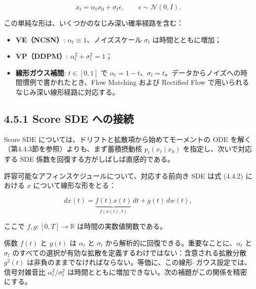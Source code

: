 \[
x_t=\alpha_t x_0 + \sigma_t\epsilon, \qquad \epsilon\sim\mathcal{N}(0,I).
\]


この単純な形は、いくつかのなじみ深い確率経路を含む：

\begin{itemize}
\item \textbf{VE（NCSN）}: $\alpha_t\equiv 1$、ノイズスケール $\sigma_t$ は時間とともに増加；
\item \textbf{VP（DDPM）}: $\alpha_t^2+\sigma_t^2=1$；
\item \textbf{線形ガウス補間}: $t\in[0,1]$ で $\alpha_t=1-t$、$\sigma_t=t$。データからノイズへの時間慣例で書かれたとき、Flow Matching および Rectified Flow で用いられるなじみ深い線形経路に対応する。
\end{itemize}


\subsection*{4.5.1 Score SDE への接続}


Score SDE については、ドリフトと拡散項から始めてモーメントの ODE を解く（第4.4.3節を参照）よりも、まず蓄積摂動核 $p_t(x_t\mid x_0)$ を指定し、次いで対応する SDE 係数を回復する方がしばしば直感的である。

許容可能なアフィンスケジュールについて、対応する前向き SDE は式 (4.4.2) における $x$ について線形な形をとる：

\[
dx(t)=\underbrace{f(t)x(t)}_{f(x(t),t)}\, dt + g(t)\, dw(t),
\]


ここで $f,g:[0,T]\to\mathbb{R}$ は時間の実数値関数である。

係数 $f(t)$ と $g(t)$ は $\alpha_t$ と $\sigma_t$ から解析的に回復できる。重要なことに、$\alpha_t$ と $\sigma_t$ のすべての選択が有効な拡散を定義するわけではない：含意される拡散分散 $g^2(t)$ は非負のままでなければならない。等価に、この線形–ガウス設定では、信号対雑音比 $\alpha_t^2/\sigma_t^2$ は時間とともに増加できない。次の補題がこの関係を精密にする。

